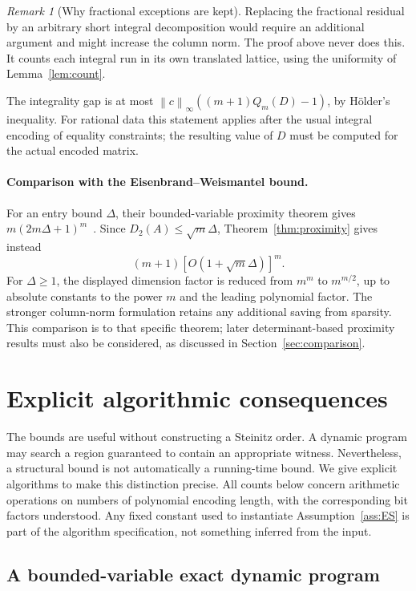 \documentclass[11pt]{article}
\theoremstyle{definition}
\theoremstyle{remark}
\newtheorem{remark}[theorem]{Remark}
\newcommand{\norm}[1]{\left\lVert #1\right\rVert}
\begin{document}
\begin{remark}[Why fractional exceptions are kept]
Replacing the fractional residual by an arbitrary short integral
decomposition would require an additional argument and might increase
the column norm. The proof above never does this. It counts each
integral run in its own translated lattice, using the uniformity of
Lemma~\ref{lem:count}.
\end{remark}

The integrality gap is at most
$\norm c_\infty((m+1)Q_m(D)-1)$, by H\"older's inequality.
For rational data this statement applies after the usual integral
encoding of equality constraints; the resulting value of $D$ must be
computed for the actual encoded matrix.

\paragraph{Comparison with the Eisenbrand--Weismantel bound.}
For an entry bound $\Delta$, their bounded-variable proximity theorem
gives $m(2m\Delta+1)^m$~\cite{EW}. Since $D_2(A)\le\sqrt m\Delta$,
Theorem~\ref{thm:proximity} gives instead
\[
 (m+1)[O(1+\sqrt m\Delta)]^m.
\]
For $\Delta\ge1$, the displayed dimension factor is reduced from
$m^m$ to $m^{m/2}$, up to absolute constants to the power $m$ and
the leading polynomial factor. The stronger column-norm formulation
retains any additional saving from sparsity. This comparison is to that
specific theorem; later determinant-based proximity results must also
be considered, as discussed in Section~\ref{sec:comparison}.

\section{Explicit algorithmic consequences}\label{sec:algorithms}

The bounds are useful without constructing a Steinitz order. A dynamic
program may search a region guaranteed to contain an appropriate witness.
Nevertheless, a structural bound is not automatically a running-time
bound. We give explicit algorithms to make this distinction precise.
All counts below concern arithmetic operations on numbers of polynomial
encoding length, with the corresponding bit factors understood. Any
fixed constant used to instantiate Assumption~\ref{ass:ES} is part of
the algorithm specification, not something inferred from the input.

\subsection{A bounded-variable exact dynamic program}
\end{document}
